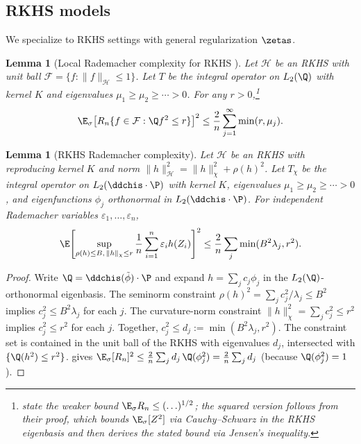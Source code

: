 \documentclass{article}
\newtheorem{lemma}[theorem]{Lemma}
\begin{document}
\subsection{RKHS models}
\label{sec:rkhs}

We specialize  to RKHS settings with general regularization $\zetas$.

\begin{lemma}[Local Rademacher complexity for RKHS
  {\citep[Theorem~6.5]{bartlett2005local}}]
\label{lem:bartlett-local}
Let $\mathcal{H}$ be an RKHS
with unit ball $\mathcal{F} = \{f : \|f\|_{\mathcal{H}} \le 1\}$.
Let $T$ be the integral operator
on $L_2(\Q)$ with kernel $K$
and eigenvalues $\mu_1 \ge \mu_2 \ge \cdots > 0$.
For any $r > 0$,\footnote{%
   state the weaker bound
  $\E_\sigma R_n \le (\ldots)^{1/2}$;
  the squared version follows
  from their proof,
  which bounds $\E_\sigma[Z^2]$
  via Cauchy--Schwarz
  in the RKHS eigenbasis
  and then derives the stated bound
  via Jensen's inequality.}
\[
\E_\sigma \qty[R_n\{f \in \mathcal{F} : \Q f^2 \le r\}]^2
  \le \frac{2}{n}
    \sum_{j=1}^\infty \min(r, \mu_j).
\]
\end{lemma}

\begin{lemma}[RKHS Rademacher complexity]
\label{lem:rkhs-rademacher}
Let $\mathcal{H}$ be an RKHS with reproducing kernel $K$
and norm $\|h\|_{\mathcal{H}}^2 = \|h\|_\chi^2 + \rho(h)^2$.
Let $T_\chi$ be the integral operator on $L_2(\ddchis \cdot \P)$
with kernel $K$,
eigenvalues $\mu_1 \ge \mu_2 \ge \cdots > 0$,
and eigenfunctions $\phi_j$
orthonormal in $L_2(\ddchis \cdot \P)$.
For independent Rademacher variables $\varepsilon_1, \ldots, \varepsilon_n$,
\begin{equation}
\label{eq:rademacher-rkhs}
\E \qty[\sup_{\rho(h) \le B,\, \|h\|_\chi \le r} \frac{1}{n} \sum_{i=1}^n \varepsilon_i h(Z_i)]^2 \le \frac{2}{n} \sum_j \min(B^2 \lambda_j, r^2).
\end{equation}
\end{lemma}
\begin{proof}
Write $\Q = \ddchis(\tilde\phi) \cdot \P$
and expand $h = \sum_j c_j \phi_j$
in the $L_2(\Q)$-orthonormal eigenbasis.
The seminorm constraint
$\rho(h)^2 = \sum_j c_j^2/\lambda_j \le B^2$
implies $c_j^2 \le B^2 \lambda_j$ for each $j$.
The curvature-norm constraint
$\|h\|_\chi^2 = \sum_j c_j^2 \le r^2$
implies $c_j^2 \le r^2$ for each $j$.
Together, $c_j^2 \le d_j := \min(B^2\lambda_j, r^2)$.
The constraint set is contained
in the unit ball of the RKHS
with eigenvalues $d_j$,
intersected with $\{\Q(h^2) \le r^2\}$.
 gives
$\E_\sigma[R_n]^2
  \le \frac{2}{n}\sum_j d_j\,\Q(\phi_j^2)
  = \frac{2}{n}\sum_j d_j$
(because $\Q(\phi_j^2) = 1$).
\end{proof}
\end{document}
